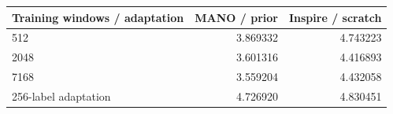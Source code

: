\begin{tabular}{lrr}
\toprule
Training windows / adaptation & MANO / prior & Inspire / scratch\\
\midrule
512 & 3.869332 & 4.743223\\
2048 & 3.601316 & 4.416893\\
7168 & 3.559204 & 4.432058\\
256-label adaptation & 4.726920 & 4.830451\\
\bottomrule
\end{tabular}
